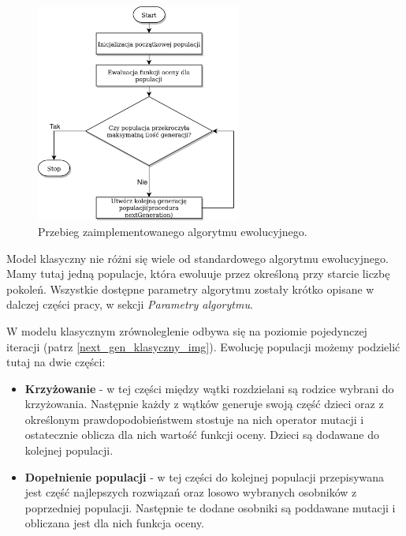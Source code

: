\begin{figure}[H]
    \centering        
    \includegraphics[width=0.6\textwidth]{img/alg_main.png}
    \caption{Przebieg zaimplementowanego algorytmu ewolucyjnego.}
    \label{alg_main_img}
\end{figure}

Model klasyczny nie różni się wiele od standardowego algorytmu ewolucyjnego. Mamy tutaj jedną populacje, która ewoluuje przez 
określoną przy starcie liczbę pokoleń. Wszystkie dostępne parametry algorytmu zostały krótko opisane w dalczej części pracy, 
w sekcji \textit{Parametry algorytmu}.

W modelu klasycznym zrównoleglenie odbywa się na poziomie pojedynczej iteracji (patrz \ref{next_gen_klasyczny_img}). 
Ewolucję populacji możemy podzielić tutaj na dwie części:
\begin{itemize}
    \item \textbf{Krzyżowanie} - w tej części między wątki rozdzielani są rodzice wybrani do krzyżowania. Następnie każdy z wątków generuje swoją część 
    dzieci oraz z określonym prawdopodobieństwem stostuje na nich operator mutacji i ostatecznie oblicza dla nich wartość funkcji oceny. 
    Dzieci są dodawane do kolejnej populacji.
    \item \textbf{Dopełnienie populacji} - w tej części do kolejnej populacji przepisywana jest część najlepszych rozwiązań oraz losowo wybranych osobników 
    z poprzedniej populacji. Następnie te dodane osobniki są poddawane mutacji i obliczana jest dla nich funkcja oceny.
\end{itemize}

\newpage

